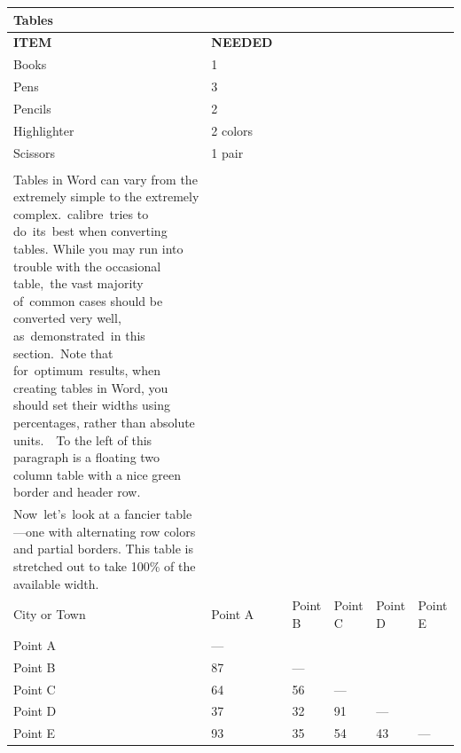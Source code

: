\documentclass[\officeparserdriver 12pt]{article}
\begin{document}
{\small\setlength{\tabcolsep}{4pt}
\begin{longtable}{|*{6}{>{\raggedright\arraybackslash}p{\dimexpr(\linewidth-12\tabcolsep-7\arrayrulewidth)/6\relax}|}}
\hline
\textcolor{hex365F91}{\textbf{{\fontsize{14pt}{16.8pt}\selectfont Tables~}}} &  &  &  &  &  \\
\hline
\endhead
\textcolor{hexFFFFFF}{\textbf{ITEM~}} & \textcolor{hexFFFFFF}{\textbf{NEEDED~}} &  &  &  &  \\
\hline
\textcolor{hex000000}{Books~} & \textcolor{hex000000}{1~} &  &  &  &  \\
\hline
\textcolor{hex000000}{Pens~} & \textcolor{hex000000}{3~} &  &  &  &  \\
\hline
\textcolor{hex000000}{Pencils~} & \textcolor{hex000000}{2~} &  &  &  &  \\
\hline
\textcolor{hex000000}{Highlighter~} & \textcolor{hex000000}{2 colors~} &  &  &  &  \\
\hline
\textcolor{hex000000}{Scissors~} & \textcolor{hex000000}{1 pair~} &  &  &  &  \\
\hline
 &  &  &  &  &  \\
\hline
\textcolor{hex000000}{Tables in Word can vary from the extremely simple to the extremely complex.~calibre~tries to do~its~best when converting tables. While you may run into trouble with the occasional table,~the vast majority of~common cases should be converted very well, as~demonstrated~in this section.~Note that for~optimum~results, when creating tables in Word, you should set their widths using percentages, rather than absolute units.~~To the left of this paragraph is a floating two column table with a nice green border and header row.~} &  &  &  &  &  \\
\hline
\textcolor{hex000000}{Now~let’s~look at a fancier table—one with alternating row colors and partial borders. This table is stretched out to take 100\% of the available width.~} &  &  &  &  &  \\
\hline
\textcolor{hex000000}{City or Town~} & \textcolor{hex000000}{Point A~} & \textcolor{hex000000}{Point B~} & \textcolor{hex000000}{Point C~} & \textcolor{hex000000}{Point D~} & \textcolor{hex000000}{Point E~} \\
\hline
\textcolor{hex000000}{Point A~} & \textcolor{hex000000}{—~} &  &  &  &  \\
\hline
\textcolor{hex000000}{Point B~} & \textcolor{hex000000}{87~} & \textcolor{hex000000}{—~} &  &  &  \\
\hline
\textcolor{hex000000}{Point C~} & \textcolor{hex000000}{64~} & \textcolor{hex000000}{56~} & \textcolor{hex000000}{—~} &  &  \\
\hline
\textcolor{hex000000}{Point D~} & \textcolor{hex000000}{37~} & \textcolor{hex000000}{32~} & \textcolor{hex000000}{91~} & \textcolor{hex000000}{—~} &  \\
\hline
\textcolor{hex000000}{Point E~} & \textcolor{hex000000}{93~} & \textcolor{hex000000}{35~} & \textcolor{hex000000}{54~} & \textcolor{hex000000}{43~} & \textcolor{hex000000}{—~} \\
\hline
\end{longtable}
}
\end{document}
